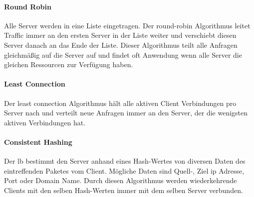 \paragraph{Round Robin}
Alle Server werden in eine Liste eingetragen. Der round-robin Algorithmus leitet Traffic immer an den ersten Server in der Liste weiter und verschiebt diesen Server danach an das Ende der Liste.
Dieser Algorithmus teilt alle Anfragen gleichmä{\ss}ig auf die Server auf und findet oft Anwendung wenn alle Server die gleichen Ressourcen zur Verfügung haben.
\cite{WhatLoadBalancer}

\paragraph{Least Connection}
Der least connection Algorithmus hält alle aktiven Client Verbindungen pro Server nach und verteilt neue Anfragen immer an den Server, der die wenigsten aktiven Verbindungen hat.
\cite{WhatLoadBalancer}

\paragraph{Consistent Hashing}
Der \ac{lb} bestimmt den Server anhand eines Hash-Wertes von diversen Daten des eintreffenden Paketes vom Client.
Mögliche Daten sind Quell-, Ziel \ac{ip} Adresse, Port oder Domain Name. Durch diesen Algorithmus werden wiederkehrende Clients mit den selben Hash-Werten immer mit dem selben Server verbunden.
\cite{WhatLoadBalancer}

